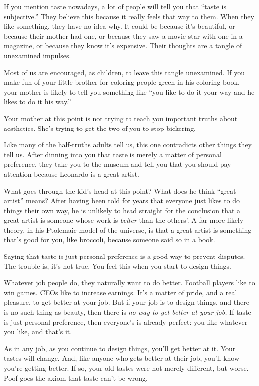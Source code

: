 If you mention taste nowadays, a lot of people will tell you that
``taste is subjective.'' They believe this because it really feels that
way to them. When they like something, they have no idea why. It could
be because it's beautiful, or because their mother had one, or because
they saw a movie star with one in a magazine, or because they know it's
expensive. Their thoughts are a tangle of unexamined impulses.

Most of us are encouraged, as children, to leave this tangle unexamined.
If you make fun of your little brother for coloring people green in his
coloring book, your mother is likely to tell you something like ``you
like to do it your way and he likes to do it his way.''

Your mother at this point is not trying to teach you important truths
about aesthetics. She's trying to get the two of you to stop bickering.

Like many of the half-truths adults tell us, this one contradicts other
things they tell us. After dinning into you that taste is merely a
matter of personal preference, they take you to the museum and tell you
that you should pay attention because Leonardo is a great artist.

What goes through the kid's head at this point? What does he think
``great artist'' means? After having been told for years that everyone
just likes to do things their own way, he is unlikely to head straight
for the conclusion that a great artist is someone whose work is
\emph{better} than the others'. A far more likely theory, in his
Ptolemaic model of the universe, is that a great artist is something
that's good for you, like broccoli, because someone said so in a book.

Saying that taste is just personal preference is a good way to prevent
disputes. The trouble is, it's not true. You feel this when you start to
design things.

Whatever job people do, they naturally want to do better. Football
players like to win games. CEOs like to increase earnings. It's a matter
of pride, and a real pleasure, to get better at your job. But if your
job is to design things, and there is no such thing as beauty, then
there is \emph{no way to get better at your job.} If taste is just
personal preference, then everyone's is already perfect: you like
whatever you like, and that's it.

As in any job, as you continue to design things, you'll get better at
it. Your tastes will change. And, like anyone who gets better at their
job, you'll know you're getting better. If so, your old tastes were not
merely different, but worse. Poof goes the axiom that taste can't be
wrong.

